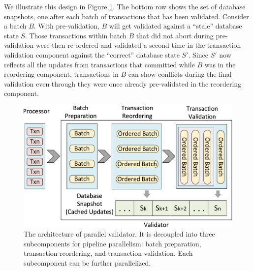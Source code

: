 We illustrate this design in Figure \ref{fig:reorder:validator}. The bottom row shows the set of database snapshots, one after each batch of transactions that has been validated. Consider a batch $B$. With pre-validation, $B$ will get validated against a ``stale'' database state $S$. Those transactions within batch $B$ that did not abort during pre-validation were then re-ordered and validated a second time in the transaction validation component against the ``correct'' database state $S'$. Since $S'$ now reflects all the updates from transactions that committed while $B$ was in the reordering component, transactions in $B$ can show conflicts during the final validation even through they were once already pre-validated in the reordering component.



\begin{figure}[t]
	\centering
	\includegraphics[width=1\columnwidth]{./figures/validator}
	\vspace{-2em}
	\caption{The architecture of parallel validator. It is decoupled into three subcomponents for pipeline parallelism: batch preparation, transaction reordering, and transaction validation. Each subcomponent can be further parallelized.}
	\vspace{-1em}
	\label{fig:reorder:validator}
\end{figure}

